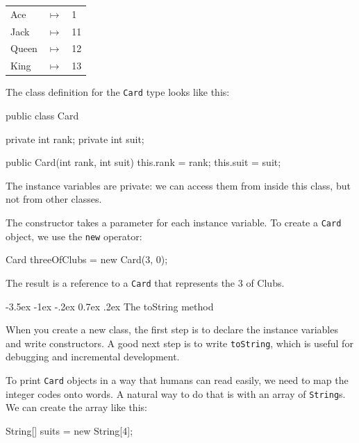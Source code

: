 \documentclass[12pt]{book}
\makeatletter
\theoremstyle{exercise}
\newcommand{\java}[1]{\verb"#1"}
\renewcommand{\section}{\@startsection{section}{1}{\z@}%
    {-3.5ex \@plus -1ex \@minus -.2ex}%
    {0.7ex \@plus.2ex}%
    {\normalfont\Large\bfseries}}
\newcommand{\java}[1]{\lstinline{#1}} %
\makeatother
\begin{document}
\begin{tabular}{l c l}
Ace & $\mapsto$ & 1 \\
Jack & $\mapsto$ & 11 \\
Queen & $\mapsto$ & 12 \\
King & $\mapsto$ & 13 \\
\end{tabular}

The class definition for the \java{Card} type looks like this:

\begin{code}
public class Card {
    private int rank;
    private int suit;

    public Card(int rank, int suit) {
        this.rank = rank;
        this.suit = suit;
    }
}
\end{code}


The instance variables are private: we can access them from inside this class, but not from other classes.

The constructor takes a parameter for each instance variable.
To create a \java{Card} object, we use the \java{new} operator:

\begin{code}
    Card threeOfClubs = new Card(3, 0);
\end{code}

The result is a reference to a \java{Card} that represents the 3 of Clubs.


\section{The toString method}
\label{printcard}


When you create a new class, the first step is to declare the instance variables and write constructors.
A good next step is to write \java{toString}, which is useful for debugging and incremental development.


To print \java{Card} objects in a way that humans can read easily, we need to map the integer codes onto words.
A natural way to do that is with an array of \java{String}s.
We can create the array like this:

\begin{code}
    String[] suits = new String[4];
\end{code}
\end{document}
